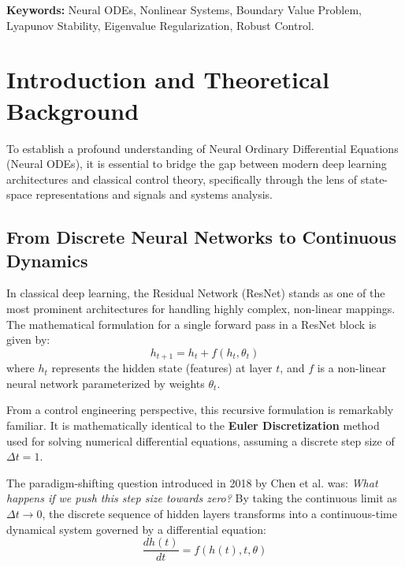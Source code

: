 \documentclass[12pt, a4paper]{article}
\begin{document}
	\vspace{1cm}
	\noindent \textbf{Keywords:} Neural ODEs, Nonlinear Systems, Boundary Value Problem, Lyapunov Stability, Eigenvalue Regularization, Robust Control.
	
	\newpage
	\tableofcontents
	\newpage
	
	\section{Introduction and Theoretical Background}
	
	To establish a profound understanding of Neural Ordinary Differential Equations (Neural ODEs), it is essential to bridge the gap between modern deep learning architectures and classical control theory, specifically through the lens of state-space representations and signals and systems analysis.
	
	\subsection{From Discrete Neural Networks to Continuous Dynamics}
	In classical deep learning, the Residual Network (ResNet) stands as one of the most prominent architectures for handling highly complex, non-linear mappings. The mathematical formulation for a single forward pass in a ResNet block is given by:
	$$ h_{t+1} = h_t + f(h_t, \theta_t) $$
	where $h_t$ represents the hidden state (features) at layer $t$, and $f$ is a non-linear neural network parameterized by weights $\theta_t$. 
	
	From a control engineering perspective, this recursive formulation is remarkably familiar. It is mathematically identical to the \textbf{Euler Discretization} method used for solving numerical differential equations, assuming a discrete step size of $\Delta t = 1$. 
	
	The paradigm-shifting question introduced in 2018 by Chen et al. was: \textit{What happens if we push this step size towards zero?} By taking the continuous limit as $\Delta t \to 0$, the discrete sequence of hidden layers transforms into a continuous-time dynamical system governed by a differential equation:
	$$ \frac{dh(t)}{dt} = f(h(t), t, \theta) $$
	
\end{document}
